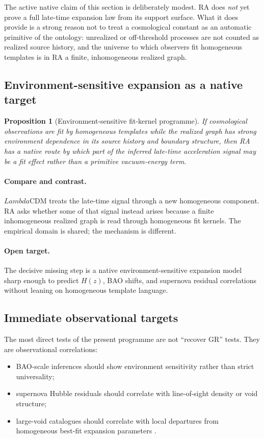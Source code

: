 \documentclass[11pt]{article}
\def\Lambda{Lambda}%
\newtheorem{proposition}{Proposition}
\begin{document}
The active native claim of this section is deliberately modest. RA does \emph{not} yet prove a full late-time expansion law from its support surface. What it does provide is a strong reason not to treat a cosmological constant as an automatic primitive of the ontology: unrealized or off-threshold processes are not counted as realized source history, and the universe to which observers fit homogeneous templates is in RA a finite, inhomogeneous realized graph.

\subsection{Environment-sensitive expansion as a native target}

\begin{proposition}[Environment-sensitive fit-kernel programme]
If cosmological observations are fit by homogeneous templates while the realized graph has strong environment dependence in its source history and boundary structure, then RA has a native route by which part of the inferred late-time acceleration signal may be a fit effect rather than a primitive vacuum-energy term.
\end{proposition}

\paragraph{Compare and contrast.} $\Lambda$CDM treats the late-time signal through a new homogeneous component. RA asks whether some of that signal instead arises because a finite inhomogeneous realized graph is read through homogeneous fit kernels. The empirical domain is shared; the mechanism is different.

\paragraph{Open target.} The decisive missing step is a native environment-sensitive expansion model sharp enough to predict $H(z)$, BAO shifts, and supernova residual correlations without leaning on homogeneous template language.

\subsection{Immediate observational targets}

The most direct tests of the present programme are not ``recover GR'' tests. They are observational correlations:
\begin{itemize}[nosep]
    \item BAO-scale inferences should show environment sensitivity rather than strict universality;
    \item supernova Hubble residuals should correlate with line-of-sight density or void structure;
    \item large-void catalogues should correlate with local departures from homogeneous best-fit expansion parameters \cite{Pan2012,Cautun2014,DESI2025}.
\end{itemize}
\end{document}
